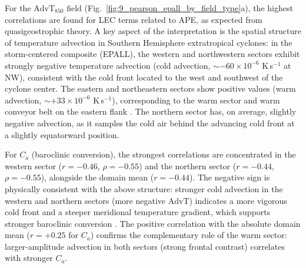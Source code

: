

For the $\mathrm{AdvT}_{850}$ field (Fig.~\ref{fig:9_pearson_epall_by_field_type}a),
the highest correlations are found for LEC terms related to APE, as expected from
quasigeostrophic theory. A key aspect of the interpretation is the spatial structure
of temperature advection in Southern Hemisphere extratropical cyclones: in the
storm-centered composite (EPALL), the western and northwestern sectors exhibit
strongly negative temperature advection (cold advection, $\sim -60 \times 10^{-6}$
K\,s$^{-1}$ at NW), consistent with the cold front located to the west and southwest
of the cyclone center. The eastern and northeastern sectors show positive values
(warm advection, $\sim +33 \times 10^{-6}$ K\,s$^{-1}$), corresponding to the warm
sector and warm conveyor belt on the eastern flank \citep{dacre2012extratropical}. The
northern sector has, on average, slightly negative advection, as it samples the cold
air behind the advancing cold front at a slightly equatorward position.

For $C_a$ (baroclinic conversion), the strongest correlations are concentrated in the
western sector ($r = -0.46$, $\rho = -0.55$) and the northern sector ($r = -0.44$,
$\rho = -0.55$), alongside the domain mean ($r = -0.44$). The negative sign is
physically consistent with the above structure: stronger cold advection in the western
and northern sectors (more negative $\mathrm{AdvT}$) indicates a more vigorous cold
front and a steeper meridional temperature gradient, which supports stronger baroclinic
conversion \citep{davies2015quasigeostrophic,de2025lorenz}. The positive correlation
with the absolute domain mean ($r = +0.25$ for $C_a$) confirms the complementary role
of the warm sector: larger-amplitude advection in both sectors (strong frontal contrast)
correlates with stronger $C_a$.


